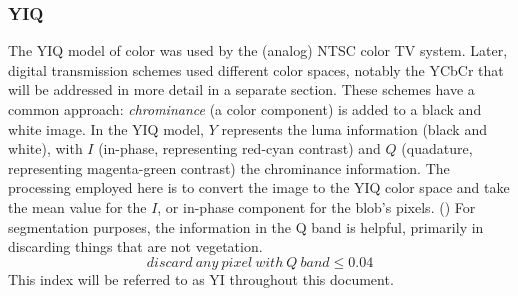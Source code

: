 \documentclass[letterpaper]{article}
\begin{document}
{{\subsubsection{YIQ}
The YIQ model of color was used by the (analog) NTSC color TV system. Later, digital transmission schemes used different color spaces, notably the YCbCr that will be addressed in more detail in a separate section. These schemes have a common approach: \textit{chrominance} (a color component) is added to a black and white image. In the YIQ model, $Y$ represents the luma information (black and white), with $I$ (in-phase, representing red-cyan contrast) and $Q$ (quadature, representing magenta-green contrast) the chrominance information. 
The processing employed here is to convert the image to the YIQ color space and take the mean value for the $I$, or in-phase component for the blob's pixels. (\cite{MathWorks_undated-jg}) For segmentation purposes, the information in the Q band is helpful, primarily in discarding things that are not vegetation.
\begin{equation}
	\label{equation:yiq}
	discard\ any\ pixel\ with\ Q\ band\leq 0.04
\end{equation}
This index will be referred to as YI throughout this document.

}}
\end{document}
